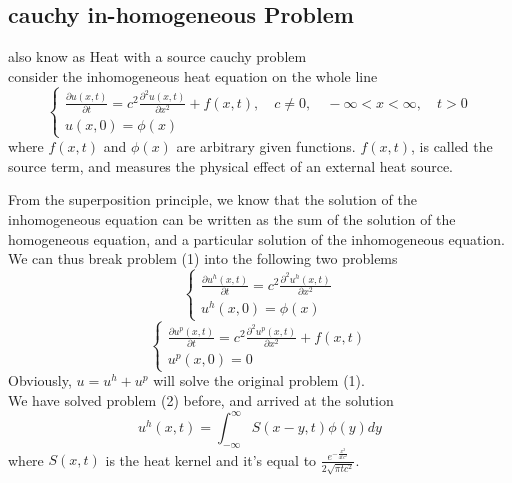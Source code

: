 \documentclass[]{article}
\begin{document}
\subsection{cauchy in-homogeneous Problem}
also know as Heat with a source cauchy problem
\\
consider the inhomogeneous heat equation on the whole line
\begin{equation}
    \begin{cases}
        \frac{\partial u\left(x,t \right)}{\partial t} = c^2 \frac{\partial^2 u(x,t)}{\partial x^2} + f(x,t),\quad c\neq 0,\quad-\infty<x<\infty,\quad t>0
        \\
        u\left(x,0 \right) = \phi\left(x\right)
    \end{cases}
\end{equation}
where $f(x, t)$ and $\phi(x)$ are arbitrary given functions. 
$f(x, t)$, is called the source term, and measures the physical effect of an external heat source.
\par
From the superposition principle, we know that the solution of the inhomogeneous equation can
be written as the sum of the solution of the homogeneous equation, and a particular solution of the
inhomogeneous equation. We can thus break problem (1) into the following two problems
\begin{equation}
    \begin{cases}
        \frac{\partial u^h\left(x,t \right)}{\partial t} = c^2 \frac{\partial^2 u^h(x,t)}{\partial x^2}
        \\
        u^h\left(x,0 \right) = \phi\left(x\right)
    \end{cases}
\end{equation}
\begin{equation}
    \begin{cases}
        \frac{\partial u^p\left(x,t \right)}{\partial t} = c^2 \frac{\partial^2 u^p(x,t)}{\partial x^2}+ f(x,t)
        \\
        u^p\left(x,0 \right) = 0
    \end{cases}
\end{equation}
Obviously, $u = u^h + u^p$ will solve the original problem (1).
\\
We have solved problem (2) before, and arrived at the solution
\begin{equation}
    u^h(x,t) = \int_{-\infty}^{\infty}S(x-y,t) \phi(y)dy        
\end{equation}
where $S(x,t)$ is the heat kernel and it's equal to $\displaystyle \frac{e^{-\frac{x^2}{4tc^2}}}{2\sqrt{\pi tc^2}}$.
\end{document}
